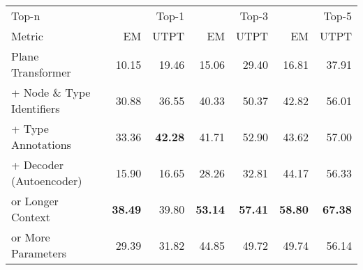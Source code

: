 \begin{tabular}{lrrrrrr}
\toprule
Top-n & \multicolumn{2}{r}{Top-1} & \multicolumn{2}{r}{Top-3} & \multicolumn{2}{r}{Top-5} \\
Metric & EM & UTPT & EM & UTPT & EM & UTPT \\
\midrule
Plane Transformer & 10.15 & 19.46 & 15.06 & 29.40 & 16.81 & 37.91 \\
+ Node \& Type Identifiers & 30.88 & 36.55 & 40.33 & 50.37 & 42.82 & 56.01 \\
+ Type Annotations & 33.36 & \bfseries 42.28 & 41.71 & 52.90 & 43.62 & 57.00 \\
+ Decoder (Autoencoder) & 15.90 & 16.65 & 28.26 & 32.81 & 44.17 & 56.33 \\
or Longer Context & \bfseries 38.49 & 39.80 & \bfseries 53.14 & \bfseries 57.41 & \bfseries 58.80 & \bfseries 67.38 \\
or More Parameters & 29.39 & 31.82 & 44.85 & 49.72 & 49.74 & 56.14 \\
\bottomrule
\end{tabular}

